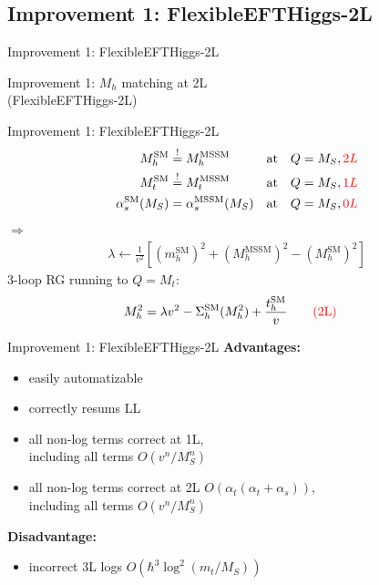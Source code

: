 \documentclass[hyperref={pdfpagelabels=false},ngerman]{beamer}
\newcommand{\cmark}{\ding{51}}%
\newcommand{\xmark}{\ding{55}}%
\newcommand{\ok}{\textcolor{darkgreen}{\cmark}}
\newcommand{\notok}{\textcolor{red}{\xmark}}
\renewcommand{\emph}{\textbf}
\newcommand{\SM}{\ensuremath{\text{SM}}}
\newcommand{\MSSM}{\ensuremath{\text{MSSM}}}
\begin{document}

\subsection{Improvement 1: FlexibleEFTHiggs-2L}

\begin{frame}{Improvement 1: FlexibleEFTHiggs-2L}
  \begin{center}
    \Large Improvement 1: $M_h$ matching at 2L \\
    (FlexibleEFTHiggs-2L)
  \end{center}
\end{frame}

\begin{frame}{Improvement 1: FlexibleEFTHiggs-2L}
  \begin{align*}
    M_h^{\SM} &\overset{!}{=} M_h^\text{MSSM} & &\text{at} & Q = M_S, \textcolor{red}{2L} \\
    M_t^{\SM} &\overset{!}{=} M_t^\text{MSSM} & &\text{at} & Q = M_S, \textcolor{red}{1L} \\
    \alpha_s^\SM(M_S) &= \alpha_s^\MSSM(M_S)  & &\text{at} & Q = M_S, \textcolor{red}{0L}
  \end{align*}
  $\Rightarrow$
  \begin{align*}
    \lambda \leftarrow \frac{1}{v^2} \left[
      (m_h^\SM)^2 + (M_h^\text{MSSM})^2 - (M_h^\SM)^2
    \right]
  \end{align*}
  3-loop RG running to $Q = M_t$:
  \begin{align*}
    M_h^2 &= \lambda v^2 - \Sigma^{\SM}_h(M_h^2) + \frac{t_h^\SM}{v}
    \qquad \text{\textcolor{red}{(2L)}}
  \end{align*}
\end{frame}

\begin{frame}{Improvement 1: FlexibleEFTHiggs-2L}
  \emph{Advantages:}
  \begin{itemize}
  \item[\ok] easily automatizable
  \item[\ok] correctly resums LL
  \item[\ok] all non-log terms correct at 1L, \\
    including all terms $O(v^n/M_S^n)$
  \item[\ok] all non-log terms correct at 2L
    $O(\alpha_t(\alpha_t + \alpha_s))$, \\
    including all terms $O(v^n/M_S^n)$
  \end{itemize}
  \emph{Disadvantage:}
  \begin{itemize}
  \item[\notok] incorrect 3L logs $O(\hbar^3 \log^2(m_t/M_S))$
  \end{itemize}
\end{frame}
\end{document}
